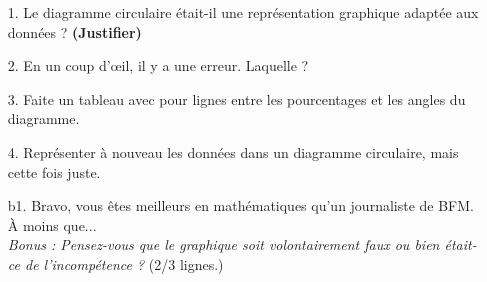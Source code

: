\documentclass[12pt]{article}
\begin{document}
\begin{itemize}
	\item[1.] Le diagramme circulaire était-il une représentation graphique adaptée aux données ? \textbf{(Justifier)}
	\item[2.] En un coup d'œil, il y a une erreur. Laquelle ?
	\item[3.] Faite un tableau avec pour lignes entre les pourcentages et les angles du diagramme.
	\item[4.] Représenter à nouveau les données dans un diagramme circulaire, mais cette fois juste.
	\item[b1.] Bravo, vous êtes meilleurs en mathématiques qu'un journaliste de BFM. À moins que... \\
	\textit{Bonus : Pensez-vous que le graphique soit volontairement faux ou bien était-ce de l'incompétence ?} (2/3 lignes.)
\end{itemize}	
\end{document}
